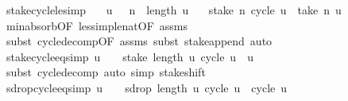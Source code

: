 \begin{isabellebody}
{\isafoldproof}%
%
\isadelimproof
\isanewline
%
\endisadelimproof
\isanewline
{}\isamarkupfalse%
\ stake{\isacharunderscore}cycle{\isacharunderscore}le{\isacharbrackleft}simp{\isacharbrackright}{\isacharcolon}\isanewline
\ \ \ {\isachardoublequoteopen}u\ {\isasymnoteq}\ {\isacharbrackleft}{\isacharbrackright}{\isachardoublequoteclose}\ {\isachardoublequoteopen}n\ {\isacharless}\ length\ u{\isachardoublequoteclose}\isanewline
\ \ \ {\isachardoublequoteopen}stake\ n\ {\isacharparenleft}cycle\ u{\isacharparenright}\ {\isacharequal}\ take\ n\ u{\isachardoublequoteclose}\isanewline
%
\isadelimproof
%
\endisadelimproof
%
\isatagproof
{}\isamarkupfalse%
\ min{\isacharunderscore}absorb{}{\isacharbrackleft}OF\ less{\isacharunderscore}imp{\isacharunderscore}le{\isacharunderscore}nat{\isacharbrackleft}OF\ assms{\isacharparenleft}{}{\isacharparenright}{\isacharbrackright}{\isacharbrackright}\isanewline
\ \ \isamarkupfalse%
\ {\isacharparenleft}subst\ cycle{\isacharunderscore}decomp{\isacharbrackleft}OF\ assms{\isacharparenleft}{}{\isacharparenright}{\isacharbrackright}{\isacharcomma}\ subst\ stake{\isacharunderscore}append{\isacharparenright}\ auto%
\endisatagproof
{\isafoldproof}%
%
\isadelimproof
\isanewline
%
\endisadelimproof
\isanewline
{}\isamarkupfalse%
\ stake{\isacharunderscore}cycle{\isacharunderscore}eq{\isacharbrackleft}simp{\isacharbrackright}{\isacharcolon}\ {\isachardoublequoteopen}u\ {\isasymnoteq}\ {\isacharbrackleft}{\isacharbrackright}\ {\isasymLongrightarrow}\ stake\ {\isacharparenleft}length\ u{\isacharparenright}\ {\isacharparenleft}cycle\ u{\isacharparenright}\ {\isacharequal}\ u{\isachardoublequoteclose}\isanewline
%
\isadelimproof
\ \ %
\endisadelimproof
%
\isatagproof
{}\isamarkupfalse%
\ {\isacharparenleft}subst\ cycle{\isacharunderscore}decomp{\isacharparenright}\ {\isacharparenleft}auto\ simp{\isacharcolon}\ stake{\isacharunderscore}shift{\isacharparenright}%
\endisatagproof
{\isafoldproof}%
%
\isadelimproof
\isanewline
%
\endisadelimproof
\isanewline
{}\isamarkupfalse%
\ sdrop{\isacharunderscore}cycle{\isacharunderscore}eq{\isacharbrackleft}simp{\isacharbrackright}{\isacharcolon}\ {\isachardoublequoteopen}u\ {\isasymnoteq}\ {\isacharbrackleft}{\isacharbrackright}\ {\isasymLongrightarrow}\ sdrop\ {\isacharparenleft}length\ u{\isacharparenright}\ {\isacharparenleft}cycle\ u{\isacharparenright}\ {\isacharequal}\ cycle\ u{\isachardoublequoteclose}\isanewline
%
\isadelimproof
\ \ %

\end{isabellebody}
